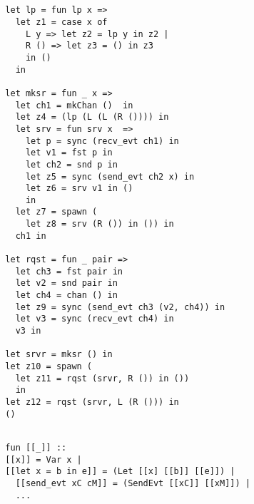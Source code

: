 \documentclass{article}
\begin{document}
\begin{lstlisting}[style=codestyle1, escapechar=\%]


  let lp = fun lp x => 
    let z1 = case x of 
      L y => let z2 = lp y in z2 |
      R () => let z3 = () in z3
      in ()
    in

  let mksr = fun _ x => 
    let ch1 = mkChan ()  in
    let z4 = (lp (L (L (R ()))) in
    let srv = fun srv x  =>
      let p = sync (recv_evt ch1) in
      let v1 = fst p in
      let ch2 = snd p in 
      let z5 = sync (send_evt ch2 x) in
      let z6 = srv v1 in ()
      in
    let z7 = spawn (
      let z8 = srv (R ()) in ()) in
    ch1 in

  let rqst = fun _ pair =>
    let ch3 = fst pair in
    let v2 = snd pair in
    let ch4 = chan () in
    let z9 = sync (send_evt ch3 (v2, ch4)) in
    let v3 = sync (recv_evt ch4) in
    v3 in

  let srvr = mksr () in
  let z10 = spawn ( 
    let z11 = rqst (srvr, R ()) in ())
    in
  let z12 = rqst (srvr, L (R ())) in
  () 

  \end{lstlisting}




\begin{lstlisting}[style=codestyle1, escapechar=\%]

  fun [[_]] ::
  [[x]] = Var x | 
  [[let x = b in e]] = (Let [[x] [[b]] [[e]]) |
    [[send_evt xC cM]] = (SendEvt [[xC]] [[xM]]) |
    ...
    
  \end{lstlisting}
\end{document}
